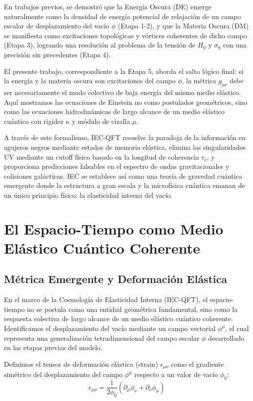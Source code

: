 \documentclass[11pt,a4paper]{article}
\begin{document}
En trabajos previos, se demostró que la Energía Oscura (DE) emerge naturalmente como la densidad de energía potencial de relajación de un campo escalar de desplazamiento del vacío $\phi$ (Etapa 1-2), y que la Materia Oscura (DM) se manifiesta como excitaciones topológicas y vórtices coherentes de dicho campo (Etapa 3), logrando una resolución al problema de la tensión de $H_0$ y $\sigma_8$ con una precisión sin precedentes (Etapa 4). 

El presente trabajo, correspondiente a la Etapa 5, aborda el salto lógico final: si la energía y la materia oscura son excitaciones del campo $\phi$, la métrica $g_{\mu\nu}$ debe ser necesariamente el modo colectivo de baja energía del mismo medio elástico. Aquí mostramos las ecuaciones de Einstein no como postulados geométricos, sino como las ecuaciones hidrodinámicas de largo alcance de un medio elástico cuántico con rigidez $\kappa$ y módulo de cizalla $\mu$. 

A través de este formalismo, IEC-QFT resuelve la paradoja de la información en agujeros negros mediante estados de memoria elástica, elimina las singularidades UV mediante un cutoff físico basado en la longitud de coherencia $r_c$, y proporciona predicciones falsables en el espectro de ondas gravitacionales y colisiones galácticas. IEC se establece así como una teoría de gravedad cuántica emergente donde la estructura a gran escala y la microfísica cuántica emanan de un único principio físico: la elasticidad interna del vacío.

\section{El Espacio-Tiempo como Medio Elástico Cuántico Coherente}

\subsection{Métrica Emergente y Deformación Elástica}
En el marco de la Cosmología de Elasticidad Interna (IEC-QFT), el espacio-tiempo no se postula como una entidad geométrica fundamental, sino como la respuesta colectiva de largo alcance de un medio elástico cuántico coherente. Identificamos el desplazamiento del vacío mediante un campo vectorial $\phi^\mu$, el cual representa una generalización tetradimensional del campo escalar $\phi$ desarrollado en las etapas previas del modelo.

Definimos el tensor de deformación elástica (strain) $\epsilon_{\mu\nu}$ como el gradiente simétrico del desplazamiento del campo $\phi^\mu$ respecto a un valor de vacío $\phi_0$:
\begin{equation}
	\epsilon_{\mu\nu} = \frac{1}{2\phi_0} \left( \partial_\mu \phi_\nu + \partial_\nu \phi_\mu \right)
\end{equation}
\end{document}
